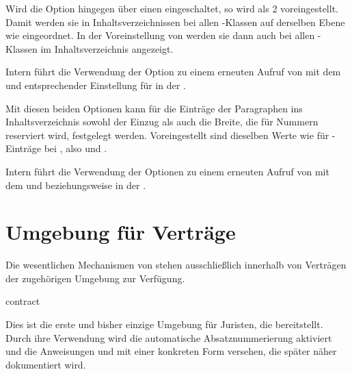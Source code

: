 Wird die Option hingegen über einen
 eingeschaltet,
so wird als  2 voreingestellt. Damit werden sie in
Inhaltsverzeichnissen bei allen \KOMAScript-Klassen auf derselben Ebene wie
%
 eingeordnet. In der
Voreinstellung von  werden sie dann auch bei
allen \KOMAScript-Klassen im Inhaltsverzeichnis angezeigt.

Intern führt die Verwendung der Option zu
einem erneuten Aufruf von
mit dem   und entsprechender Einstellung für
 in der .%
\EndIndexGroup


\begin{Declaration}
\end{Declaration}
Mit diesen beiden Optionen kann für die Einträge der Paragraphen ins
Inhaltsverzeichnis sowohl der Einzug als auch die Breite, die für Nummern
reserviert wird, festgelegt werden. Voreingestellt
sind dieselben Werte wie für
-Einträge%
 bei , also
 und .

Intern führt die Verwendung der Optionen
zu einem erneuten Aufruf von
 mit
dem   und 
beziehungsweise  in der
.%
\EndIndexGroup


\section{Umgebung für Verträge}
\label{sec:scrjura.contract}

\BeginIndexGroup
{}
Die wesentlichen Mechanismen von  stehen ausschließlich
innerhalb von Verträgen der zugehörigen Umgebung zur Verfügung.

\begin{Declaration}
  \begin{Environment}{contract}\end{Environment}
\end{Declaration}
Dies ist die erste und bisher einzige Umgebung für Juristen, die
 bereitstellt. Durch ihre Verwendung wird die automatische
Absatznummerierung aktiviert und die Anweisungen
 und  mit
einer konkreten Form versehen, die später näher dokumentiert wird.

